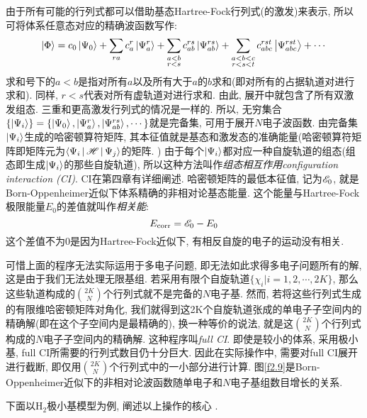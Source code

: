 由于所有可能的行列式都可以借助基态Hartree-Fock行列式(的激发)来表示, 
所以可将体系任意态对应的精确波函数写作:
\begin{equation}
\Ket{\Phi}=c_0\Ket{\Psi_0}+\sum_{ra}c_a^r\Ket{\Psi_a^r}+\sum_{\substack{a<b\\r<s}}c_{ab}^{rs}\Ket{\Psi_{ab}^{rs}}+\sum_{\substack{a<b<c\\r<s<t}}c_{abc}^{rst}\Ket{\Psi_{abc}^{rst}}+\cdots
\end{equation}
求和号下的$a<b$是指对所有$a$以及所有大于$a$的$b$求和(即对所有的占据轨道对进行求和). 
同样, 
$r<s$代表对所有虚轨道对进行求和. 
由此, 
展开中就包含了所有双激发组态. 
三重和更高激发行列式的情况是一样的. 
所以, 
无穷集合$\{\Ket{\Psi_i} \}=\{\Ket{\Psi_0}, \Ket{\Psi_a^r}, \Ket{\Psi_{ab}^{rs}}, \cdots \}$就是完备集, 
可用于展开$N$电子波函数. 
由完备集$\Ket{\Psi_i}$生成的哈密顿算符矩阵, 
其本征值就是基态和激发态的准确能量(哈密顿算符矩阵即矩阵元为$\Braket{\Psi_i|\mathscr{H}|\Psi_j}$的矩阵.
) 由于每个$\Ket{\Psi_i}$都对应一种自旋轨道的组态(组态即生成$\Ket{\Psi_i}$的那些自旋轨道), 
所以这种方法叫作\emph{组态相互作用configuration interaction ({CI\rm})}. 
CI在第四章有详细阐述. 
哈密顿矩阵的最低本征值, 
记为$\mathscr{E}_0$, 
就是Born-Oppenheimer近似下体系精确的非相对论基态能量. 
这个能量与Hartree-Fock极限能量$E_0$的差值就叫作\emph{相关能}:
\begin{equation}
E_{\mathrm{corr}}=\mathscr{E}_0-E_0
\end{equation} 
这个差值不为0是因为Hartree-Fock近似下, 
有相反自旋的电子的运动没有相关.


可惜上面的程序无法实际运用于多电子问题, 
即无法如此求得多电子问题所有的解, 
这是由于我们无法处理无限基组. 
若采用有限个自旋轨道$\{\chi_i|i=1,2,\cdots,2K \}$, 
那么这些轨道构成的$\binom{2K}{N}$个行列式就不是完备的$N$电子基. 
然而, 
若将这些行列式生成的有限维哈密顿矩阵对角化, 
我们就得到这2K个自旋轨道张成的单电子子空间内的精确解(即在这个子空间内是最精确的), 
换一种等价的说法, 
就是这$\binom{2K}{N}$个行列式构成的$N$电子子空间内的精确解. 
这种程序叫\emph{full CI}. 
即使是较小的体系, 
采用极小基, 
full CI所需要的行列式数目仍十分巨大. 
因此在实际操作中, 
需要对full CI展开进行截断, 
即仅用$\binom{2K}{N}$个行列式中的一小部分进行计算. 
图\ref{f2.9}是Born-Oppenheimer近似下的非相对论波函数随单电子和$N$电子基组数目增长的关系.



下面以$\text{H}_2$极小基模型为例, 
阐述以上操作的核心 .

